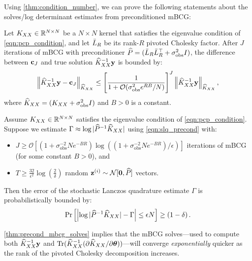 Using \cref{thm:condition_number}, we can prove the following statements about the solves/log determinant estimates from preconditioned mBCG:
%
\begin{theorem}
  \label{thm:precond_mbcg_solves}
  Let $K_{XX} \in \mathbb{R}^{N \times N}$ be a $N \times N$ kernel that satisfies the eigenvalue condition of \cref{eqn:pcp_condition},
	and let $\bar{L}_R$ be its rank-$R$ pivoted Cholesky factor.
	After $J$ iterations of mBCG with preconditioner $\widehat{P} = (\bar{L}_R \bar{L}_R^\top + \sigma_\text{obs}^2 I)$,
	the difference between $\mathbf{c}_J$ and true solution $\widehat{K}_{XX}^{-1} \mathbf{y}$ is bounded by:
  \begin{equation*}
    \left \Vert \trainK^{-1} \by - \bc_{J} \right \Vert_{\trainK}
    \leq \Bigg[ \frac 1 {1 + \bigo{\sigma^{2}_\text{obs} e^{RB}/N}} \Bigg]^{J}
    \left \Vert \trainK^{-1} \by \right \Vert_{\trainK},
		\nonumber
  \end{equation*}
	where $\widehat{K}_{XX} = (K_{XX} + \sigma^2_\text{obs} I)$ and $B > 0$ is a constant.
\end{theorem}
%
\begin{theorem}
  \label{thm:precond_mbcg_logdet}
  Assume $K_{XX} \in \mathbb{R}^{N \times N}$ satisfies the eigenvalue condition of \cref{eqn:pcp_condition}.
	Suppose we estimate $\Gamma \approx \log \vert \widehat{P}^{-1} \widehat{K}_{XX} \vert$ using \cref{eqn:slq_precond} with:
	\begin{itemize}
		\item $J \geq \mathcal{O} \left[ (1 + \sigma^{-2}_\text{obs} N e^{-BR}) \log \left( ( 1 + \sigma^{-2}_\text{obs} N e^{-BR} ) / \epsilon \right) \right]$ iterations of mBCG (for some constant $B > 0$), and
		\item $T \geq \frac{32}{\epsilon^2} \log \left( \frac 2 \delta \right)$ random $\bz^{(i)} \sim \normaldist{\bzero}{\trainP}$ vectors.
	\end{itemize}
  Then the error of the stochastic Lanczos quadrature estimate $\Gamma$ is probabilistically bounded by:
  \begin{equation*}
    \textrm{Pr}\left[\Bigl\vert \log \vert \widehat{P}^{-1} \widehat{K}_{XX} \vert - \Gamma \Bigr\vert \leq \epsilon N \right] \geq \left( 1 - \delta \right).
  \end{equation*}
\end{theorem}
%
\cref{thm:precond_mbcg_solves} implies that the mBCG solves---used to compute both $\widehat{K}_{XX}^{-1} \mathbf{y}$ and $\tr{ \trainK^{-1} (\partial \trainK / \partial \btheta)}$---will converge \emph{exponentially} quicker as the rank of the pivoted Cholesky decomposition increases.
